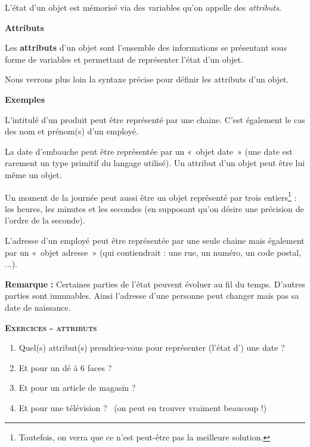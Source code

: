 L'état d'un objet est mémorisé via des
variables qu'on appelle des \textit{attributs}.

\bigskip

{\sffamily\bfseries\upshape
Attributs}

Les \textbf{attributs} d'un objet sont
l'ensemble des informations se présentant sous forme
de variables et permettant de représenter l'état
d'un objet.

Nous verrons plus loin la syntaxe précise pour définir les attributs
d'un objet.

{
\textbf{Exemples} }

\begin{liste}
	\item 
		L'intitulé d'un produit peut être
		représenté par une chaine. C'est également le cas des
		nom et prénom(s) d'un employé.
	\item 
		La date d'embauche peut être représentée par un «~objet
		date~» (une date est rarement un type primitif du langage utilisé). Un
		attribut d'un objet peut être lui même un objet.
	\item 
		Un moment de la journée peut aussi être un objet représenté par trois
		entiers\footnote{Toutefois, on verra que ce n'est
		peut-être pas la meilleure solution.} : les heures, les minutes et les
		secondes (en supposant qu'on désire une précision de
		l'ordre de la seconde).
	\item 
		L'adresse d'un employé peut être
		représentée par une seule chaine mais également par un «~objet
		adresse~» (qui contiendrait : une rue, un numéro, un code postal,
		...).
\end{liste}

{\textbf{Remarque}\textbf{ : }Certaines parties de
l'état peuvent évoluer au fil du temps.
D'autres parties sont immuables. Ainsi
l'adresse d'une personne peut changer
mais pas sa date de naissance. }

\clearpage
{}
{\sffamily\bfseries\scshape
Exercices - attributs}

\begin{enumerate}
	\item 
		Quel(s) attribut(s) prendriez-vous pour représenter
		(l'état d') une date ?
	\item 
		Et pour un dé à 6 faces ?
	\item 
		Et pour un article de magasin ?
	\item 
		Et pour une télévision ? \ (on peut en trouver vraiment beaucoup !)
\end{enumerate}

